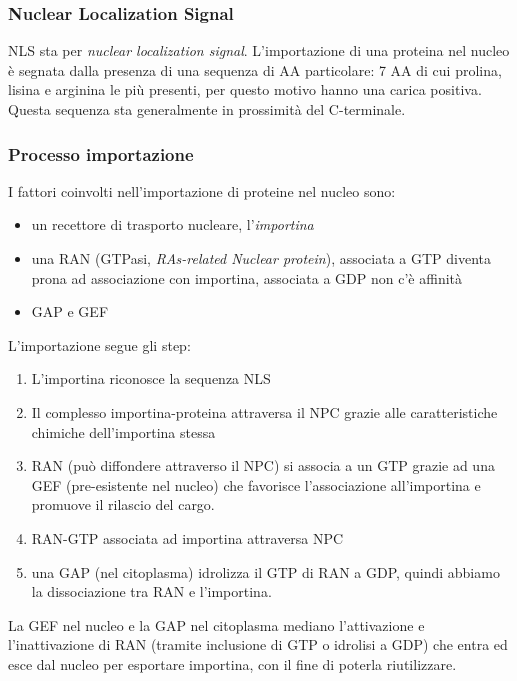         \subsubsection{Nuclear Localization Signal}
            NLS sta per \textit{nuclear localization signal}. L'importazione di una proteina nel nucleo è segnata dalla presenza di una sequenza di AA particolare: 7 AA di cui prolina, lisina e arginina le più presenti, per questo motivo hanno una carica positiva. \\
            Questa sequenza sta generalmente in prossimità del C-terminale.
            
        \subsubsection{Processo importazione}
            I fattori coinvolti nell'importazione di proteine nel nucleo sono:
            \begin{itemize}
                \item un recettore di trasporto nucleare, l'\textit{importina}
                \item una RAN (GTPasi, \textit{RAs-related Nuclear protein}), associata a GTP diventa prona ad associazione con importina, associata a GDP non c'è affinità
                \item GAP e GEF
            \end{itemize}
            L'importazione segue gli step:
            \begin{enumerate}
                \item L'importina riconosce la sequenza NLS
                \item Il complesso importina-proteina attraversa il NPC grazie alle caratteristiche chimiche dell'importina stessa
                \item RAN (può diffondere attraverso il NPC) si associa a un GTP grazie ad una GEF (pre-esistente nel nucleo) che favorisce l'associazione all'importina e promuove il rilascio del cargo.
                \item RAN-GTP associata ad importina attraversa NPC
                \item una GAP (nel citoplasma) idrolizza il GTP di RAN a GDP, quindi abbiamo la dissociazione tra RAN e l'importina.
            \end{enumerate}
            La GEF nel nucleo e la GAP nel citoplasma mediano l'attivazione e l'inattivazione di RAN (tramite inclusione di GTP o idrolisi a GDP) che entra ed esce dal nucleo per esportare importina, con il fine di poterla riutilizzare.\\
